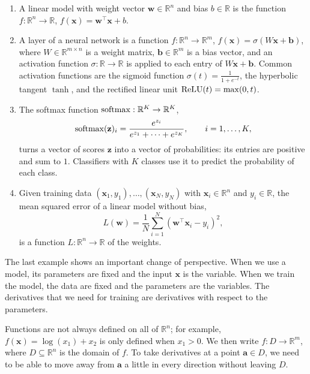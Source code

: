 \begin{example}\label{L3-ex:ml-functions}
    \begin{enumerate}
        \item A linear model with weight vector $\mathbf{w} \in \mathbb{R}^n$ and bias $b \in \mathbb{R}$ is the function $f: \mathbb{R}^n \to \mathbb{R}$, $f(\mathbf{x}) = \mathbf{w}^\top \mathbf{x} + b$.
        \item A layer of a neural network is a function $f: \mathbb{R}^n \to \mathbb{R}^m$, $f(\mathbf{x}) = \sigma(W\mathbf{x} + \mathbf{b})$, where $W \in \mathbb{R}^{m \times n}$ is a weight matrix, $\mathbf{b} \in \mathbb{R}^m$ is a bias vector, and an activation function $\sigma: \mathbb{R} \to \mathbb{R}$ is applied to each entry of $W\mathbf{x} + \mathbf{b}$. Common activation functions are the sigmoid function $\sigma(t) = \frac{1}{1 + e^{-t}}$, the hyperbolic tangent $\tanh$, and the rectified linear unit $\operatorname{ReLU}(t) = \max(0, t)$.
        \item The softmax function $\operatorname{softmax}: \mathbb{R}^K \to \mathbb{R}^K$,
        \[\operatorname{softmax}(\mathbf{z})_i = \frac{e^{z_i}}{e^{z_1} + \cdots + e^{z_K}}, \qquad i = 1, \ldots, K,\]
        turns a vector of scores $\mathbf{z}$ into a vector of probabilities: its entries are positive and sum to $1$. Classifiers with $K$ classes use it to predict the probability of each class.
        \item Given training data $(\mathbf{x}_1, y_1), \ldots, (\mathbf{x}_N, y_N)$ with $\mathbf{x}_i \in \mathbb{R}^n$ and $y_i \in \mathbb{R}$, the mean squared error of a linear model without bias,
        \[L(\mathbf{w}) = \frac{1}{N} \sum_{i=1}^N (\mathbf{w}^\top \mathbf{x}_i - y_i)^2,\]
        is a function $L: \mathbb{R}^n \to \mathbb{R}$ of the weights.
    \end{enumerate}
\end{example}

The last example shows an important change of perspective. When we use a model, its parameters are fixed and the input $\mathbf{x}$ is the variable. When we train the model, the data are fixed and the parameters are the variables. The derivatives that we need for training are derivatives with respect to the parameters.

Functions are not always defined on all of $\mathbb{R}^n$; for example, $f(\mathbf{x}) = \log(x_1) + x_2$ is only defined when $x_1 > 0$. We then write $f: D \to \mathbb{R}^m$, where $D \subseteq \mathbb{R}^n$ is the domain of $f$. To take derivatives at a point $\mathbf{a} \in D$, we need to be able to move away from $\mathbf{a}$ a little in every direction without leaving $D$.

